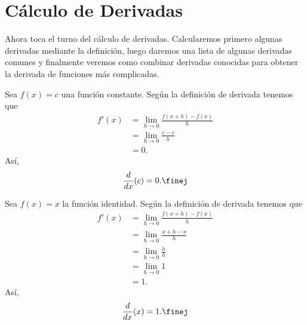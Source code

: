 \documentclass[12pt,a4paper]{book}
\begin{document}
    \section{Cálculo de Derivadas}\label{sec:calculo-derivadas}

    Ahora toca el turno del cálculo de derivadas. Calcularemos primero algunas
    derivadas mediante la definición, luego daremos una lista de algunas
    derivadas comunes y finalmente veremos como combinar derivadas conocidas
    para obtener la derivada de funciones más complicadas.

    \begin{ejemplo}\label{ejm:72}
        Sea $f(x)=c$ una
        función constante. Según la definición de derivada tenemos que
        \begin{align*}
            f'(x)&=\lim_{h\to 0}\frac{f(x+h)-f(x)}{h}\\
            &=\lim_{h\to 0}\frac{c-c}{h}\\
            &=0.
        \end{align*}
        Así,
        \begin{equation*}
            \frac{d}{dx}(c)=0.\finej
        \end{equation*}
    \end{ejemplo}

    \begin{ejemplo}\label{ejm:73}
        Sea $f(x)=x$ la función
        identidad. Según la definición de derivada tenemos que
        \begin{align*}
            f'(x)&=\lim_{h\to 0}\frac{f(x+h)-f(x)}{h}\\
            &=\lim_{h\to 0}\frac{x+h-x}{h}\\
            &=\lim_{h\to 0}\frac{h}{h}\\
            &=\lim_{h\to 0}1\\
            &=1.
        \end{align*}
        Así,
        \begin{equation*}
            \frac{d}{dx}(x)=1.\finej
        \end{equation*}
    \end{ejemplo}
\end{document}
